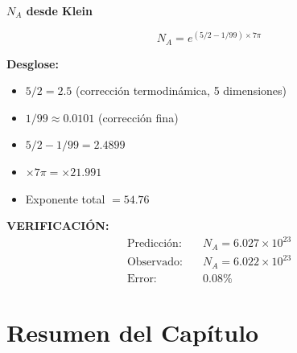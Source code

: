 \begin{nivelmatematico}
\textbf{$N_A$ desde Klein}

\begin{equation}
\boxed{N_A = e^{(5/2 - 1/99) \times 7\pi}}
\end{equation}

\textbf{Desglose:}
\begin{itemize}
    \item $5/2 = 2.5$ (corrección termodinámica, 5 dimensiones)
    \item $1/99 \approx 0.0101$ (corrección fina)
    \item $5/2 - 1/99 = 2.4899$
    \item $\times 7\pi = \times 21.991$
    \item Exponente total $= 54.76$
\end{itemize}

\textbf{VERIFICACIÓN:}
\begin{align}
\text{Predicción:} & \quad N_A = 6.027 \times 10^{23}\\
\text{Observado:} & \quad N_A = 6.022 \times 10^{23}\\
\text{Error:} & \quad 0.08\%
\end{align}
\end{nivelmatematico}


\section{Resumen del Capítulo}

